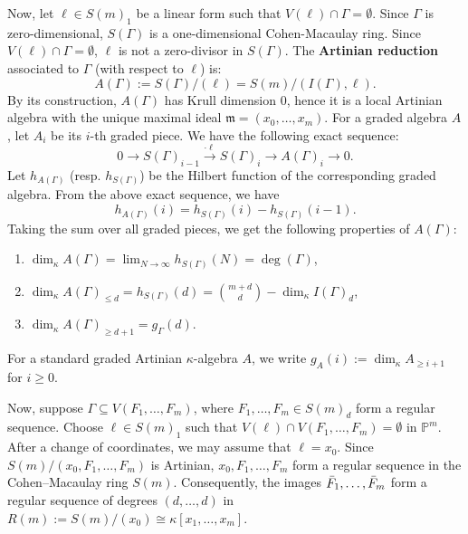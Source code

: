 \documentclass[11pt]{amsart}
\theoremstyle{definition}
\newcommand{\PP}{\mathbb{P}}
\newcommand{\sg}{S(\Gamma)}
\newcommand{\ag}{A(\Gamma)}
\newcommand{\Fb}{\Bar{F}}
\newcommand{\dimk}{\dim_{\kappa}}
\newcommand{\ka}{\kappa}
\begin{document}




Now, let $\ell \in S(m)_1$ be a linear form such that $V(\ell)\cap \Gamma=\emptyset$. Since $\Gamma$ is zero-dimensional, $\sg$ is a one-dimensional Cohen-Macaulay ring. Since $V(\ell)\cap\Gamma=\emptyset$, $\ell$ is not a zero-divisor in $\sg$. The \textbf{Artinian reduction} associated to $\Gamma$ (with respect to $\ell$) is:
\[
A(\Gamma):=S(\Gamma)/(\ell)=S(m)/(I(\Gamma),\ell).
\]
By its construction, $A(\Gamma)$ has Krull dimension $0$, hence it is a local Artinian algebra with the unique maximal ideal $\mathfrak{m}=(x_0, \dots, x_m)$. For a graded algebra $A$, let $A_i$ be its $i$-th graded piece.
We have the following exact sequence:
\[
0 \to \sg_{i-1} \xrightarrow{\cdot \ell}\sg_i \to \ag_{i} \to 0.
\]
Let $h_{\ag}$ (resp. $h_{\sg}$) be the Hilbert function of the corresponding graded algebra. From the above exact sequence, we have
\[
h_{\ag}(i)=h_{\sg}(i)-h_{\sg}(i-1).
\]
Taking the sum over all graded pieces, we get the following properties of $\ag$:
\begin{enumerate}
    \item $\dim_\ka\ag
    =\lim_{N \to \infty}h_{\sg}(N)=\deg(\Gamma)$,
    \item $\dimk {\ag}_{\leq d}
    =h_{\sg}(d)=\binom{m+d}{d}- \dim_{\ka} I(\Gamma)_d$,
    \item $\dimk {\ag}_{\geq d+1}=g_\Gamma(d)$.
\end{enumerate}
For a standard graded Artinian $\kappa$-algebra $A$, we write
$g_A(i):=\dim_\kappa A_{\geq i+1}$ for $i\geq 0$.

Now, suppose $\Gamma\subseteq V(F_1,\ldots,F_m)$, where
$F_1,\ldots,F_m\in S(m)_d$ form a regular sequence.
Choose $\ell\in S(m)_1$ such that
$V(\ell)\cap V(F_1,\ldots,F_m)=\emptyset$ in $\PP^m$.
After a change of coordinates, we may assume that $\ell=x_0$.
Since $S(m)/(x_0,F_1,\ldots,F_m)$ is Artinian,
$x_0,F_1,\ldots,F_m$ form a regular sequence
in the Cohen--Macaulay ring $S(m)$.
Consequently, the images $\Fb_1,\ldots,\Fb_m$
form a regular sequence of degrees $(d,\ldots,d)$ in
$R(m):=S(m)/(x_0)\cong\kappa[x_1,\ldots,x_m]$.
\end{document}
